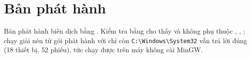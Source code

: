 \section{Bản phát hành}
Bản phát hành biên dịch bằng . Kiểm tra bằng  cho thấy  và  không phụ thuộc , , ; chạy  giải nén từ gói phát hành với  chỉ còn \texttt{C:\textbackslash Windows\textbackslash System32} vẫn trả lời  đúng (18 thiết bị, 52 phiếu), tức chạy được trên máy không cài MinGW.
